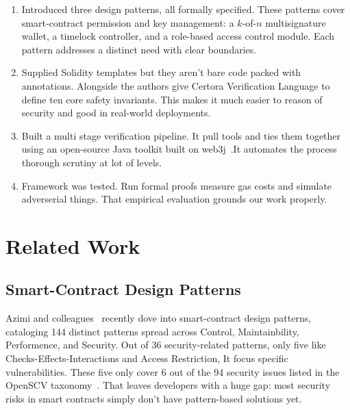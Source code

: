 \documentclass[conference]{IEEEtran}
\begin{document}
\begin{enumerate}
  \item Introduced three design patterns, all formally
        specified.  These patterns cover smart-contract permission and key
        management: a $k$-of-$n$ multisignature wallet, a timelock
        controller, and a role-based access control module.  Each pattern
        addresses a distinct need with clear boundaries.
  \item Supplied Solidity templates but they aren't bare
        code packed with annotations.  Alongside the authors give
        Certora Verification Language to define ten
        core safety invariants. This makes it much easier to reason of
        security and good in real-world deployments.
  \item Built a multi stage verification pipeline.  It pull tools
            and ties them together using an open-source Java toolkit built on
        web3j~\cite{web3j2024}.It automates the
        process thorough scrutiny at lot of levels.
  \item Framework was tested. Run formal proofs measure
        gas costs and simulate adverserial things.  That empirical evaluation grounds our
        work properly.
\end{enumerate}


\section{Related Work}
\label{sec:related}

\subsection{Smart-Contract Design Patterns}

Azimi and colleagues~\cite{azimi2025systematic} recently dove into
smart-contract design patterns, cataloging 144 distinct patterns spread
across Control, Maintainbility, Performence, and Security.  Out of 36
security-related patterns, only five like Checks-Effects-Interactions
and Access Restriction, It focus specific vulnerabilities.
These five only cover 6 out of the 94 security issues listed in the
OpenSCV taxonomy~\cite{vidal2024openscv}.  That leaves developers with
a huge gap: most security risks in smart contracts simply don't have
pattern-based solutions yet.
\end{document}
